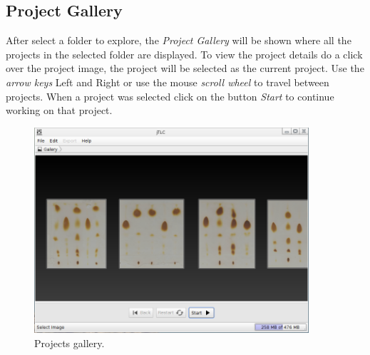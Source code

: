 \subsection{Project Gallery}
After select a folder to explore, the \emph{Project Gallery} will be shown where all the projects in the selected folder are displayed. To view the project details do a click over the project image, the project will be selected as the current project. Use the \emph{arrow keys} Left and Right or use the mouse \emph{scroll wheel} to travel between projects. When a project was selected click on the button \emph{Start} to continue working on that project.
\begin{figure}[H]
	\vspace{0cm}
	\centering
	\includegraphics[width=385px]{imagenes/gallery}
	\centering
	\vspace{-0.4cm}
	\caption{Projects gallery.}
	\label{fig:gallery}
	\vspace{-0.25cm}
\end{figure}
\newpage


